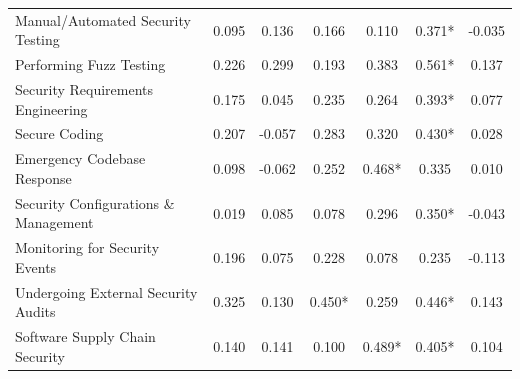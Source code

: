 \begin{table}[ht!]
{\begin{tabular}{lcccccc}
Manual/Automated Security Testing &
\cellcolor[HTML]{ECF7A6}0.095 &
\cellcolor[HTML]{E5F49B}0.136 &
\cellcolor[HTML]{DFF293}0.166 &
\cellcolor[HTML]{E9F6A1}0.110 &
\cellcolor[HTML]{ADDC6F}0.371* &
\cellcolor[HTML]{FFFAB6}-0.035 \\

Performing Fuzz Testing &
\cellcolor[HTML]{D3EC87}0.226 &
\cellcolor[HTML]{BFE47A}0.299 &
\cellcolor[HTML]{DAF08D}0.193 &
\cellcolor[HTML]{A9DA6C}0.383 &
\cellcolor[HTML]{73C264}0.561* &
\cellcolor[HTML]{E5F49B}0.137 \\

Security Requirements Engineering &
\cellcolor[HTML]{DDF191}0.175 &
\cellcolor[HTML]{F7FCB4}0.045 &
\cellcolor[HTML]{CFEB85}0.235 &
\cellcolor[HTML]{C9E881}0.264 &
\cellcolor[HTML]{A7D96B}0.393* &
\cellcolor[HTML]{F1F9AC}0.077 \\

Secure Coding &
\cellcolor[HTML]{D7EE8A}0.207 &
\cellcolor[HTML]{FFF6B0}-0.057 &
\cellcolor[HTML]{C3E67D}0.283 &
\cellcolor[HTML]{BBE278}0.320 &
\cellcolor[HTML]{9BD469}0.430* &
\cellcolor[HTML]{FAFDB8}0.028 \\

Emergency Codebase Response &
\cellcolor[HTML]{ECF7A6}0.098 &
\cellcolor[HTML]{FFF6B0}-0.062 &
\cellcolor[HTML]{CBE982}0.252 &
\cellcolor[HTML]{91D068}0.468* &
\cellcolor[HTML]{B7E075}0.335 &
\cellcolor[HTML]{FDFEBC}0.010 \\

Security Configurations \& Management &
\cellcolor[HTML]{FBFDBA}0.019 &
\cellcolor[HTML]{EFF8AA}0.085 &
\cellcolor[HTML]{F1F9AC}0.078 &
\cellcolor[HTML]{C1E57B}0.296 &
\cellcolor[HTML]{B3DF72}0.350* &
\cellcolor[HTML]{FFF8B4}-0.043 \\

Monitoring for Security Events &
\cellcolor[HTML]{D9EF8B}0.196 &
\cellcolor[HTML]{F1F9AC}0.075 &
\cellcolor[HTML]{D1EC86}0.228 &
\cellcolor[HTML]{F1F9AC}0.078 &
\cellcolor[HTML]{CFEB85}0.235 &
\cellcolor[HTML]{FEEDA1}-0.113 \\

Undergoing External Security Audits &
\cellcolor[HTML]{B9E176}0.325 &
\cellcolor[HTML]{E6F59D}0.130 &
\cellcolor[HTML]{96D268}0.450* &
\cellcolor[HTML]{C9E881}0.259 &
\cellcolor[HTML]{96D268}0.446* &
\cellcolor[HTML]{E3F399}0.143 \\

Software Supply Chain Security &
\cellcolor[HTML]{E5F49B}0.140 &
\cellcolor[HTML]{E3F399}0.141 &
\cellcolor[HTML]{ECF7A6}0.100 &
\cellcolor[HTML]{89CC67}0.489* &
\cellcolor[HTML]{A5D86A}0.405* &
\cellcolor[HTML]{EBF7A3}0.104 \\
\bottomrule
\end{tabular}
}
\end{table}
